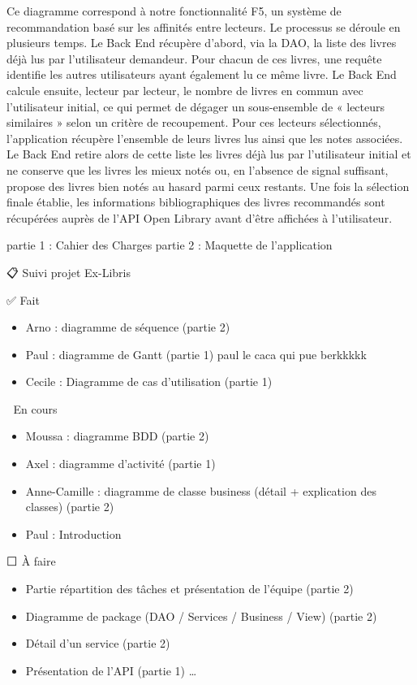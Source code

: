 \documentclass[
  letterpaper,
  DIV=11,
  numbers=noendperiod]{scrartcl}
\providecommand{\tightlist}{%
  \setlength{\itemsep}{0pt}\setlength{\parskip}{0pt}}
\begin{document}
Ce diagramme correspond à notre fonctionnalité F5, un système de
recommandation basé sur les affinités entre lecteurs. Le processus se
déroule en plusieurs temps. Le Back End récupère d'abord, via la DAO, la
liste des livres déjà lus par l'utilisateur demandeur. Pour chacun de
ces livres, une requête identifie les autres utilisateurs ayant
également lu ce même livre. Le Back End calcule ensuite, lecteur par
lecteur, le nombre de livres en commun avec l'utilisateur initial, ce
qui permet de dégager un sous-ensemble de « lecteurs similaires » selon
un critère de recoupement. Pour ces lecteurs sélectionnés, l'application
récupère l'ensemble de leurs livres lus ainsi que les notes associées.
Le Back End retire alors de cette liste les livres déjà lus par
l'utilisateur initial et ne conserve que les livres les mieux notés ou,
en l'absence de signal suffisant, propose des livres bien notés au
hasard parmi ceux restants. Une fois la sélection finale établie, les
informations bibliographiques des livres recommandés sont récupérées
auprès de l'API Open Library avant d'être affichées à l'utilisateur.

partie 1 : Cahier des Charges partie 2 : Maquette de l'application

📋 Suivi projet Ex-Libris

✅ Fait

\begin{itemize}
\tightlist
\item
  Arno : diagramme de séquence (partie 2)
\item
  Paul : diagramme de Gantt (partie 1) paul le caca qui pue berkkkkk
\item
  Cecile : Diagramme de cas d'utilisation (partie 1)
\end{itemize}

🔄 En cours

\begin{itemize}
\tightlist
\item
  Moussa : diagramme BDD (partie 2)
\item
  Axel : diagramme d'activité (partie 1)
\item
  Anne-Camille : diagramme de classe business (détail + explication des
  classes) (partie 2)
\item
  Paul : Introduction
\end{itemize}

⬜ À faire

\begin{itemize}
\tightlist
\item
  Partie répartition des tâches et présentation de l'équipe (partie 2)
\item
  Diagramme de package (DAO / Services / Business / View) (partie 2)
\item
  Détail d'un service (partie 2)
\item
  Présentation de l'API (partie 1) \ldots{}
\end{itemize}
\end{document}
